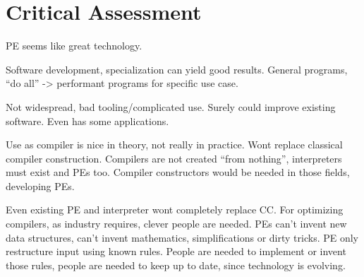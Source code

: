 
\section{Critical Assessment}\label{sec:discussion}

PE seems like great technology.

Software development, specialization can yield good results.
General programs, ``do all'' -> performant programs for specific use case.

Not widespread, bad tooling/complicated use.
Surely could improve existing software.
Even has some applications.

Use as compiler is nice in theory, not really in practice.
Wont replace classical compiler construction.
Compilers are not created ``from nothing'', interpreters must exist and PEs too.
Compiler constructors would be needed in those fields, developing PEs.

Even existing PE and interpreter wont completely replace CC.
For optimizing compilers, as industry requires, clever people are needed.
PEs can't invent new data structures, can't invent mathematics, simplifications or dirty tricks.
PE only restructure input using known rules.
People are needed to implement or invent those rules,
people are needed to keep up to date, since technology is evolving.



